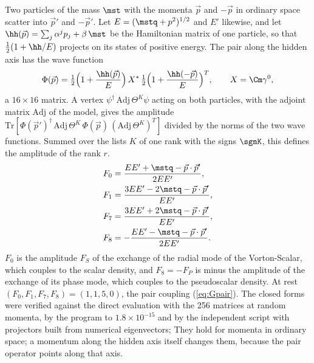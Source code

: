 Two particles of the mass $\mst$ with the momenta $\vec p$ and $-\vec p$ in ordinary space scatter
into $\vec p'$ and $-\vec p'$. Let $E=(\mstq+p^{2})^{1/2}$ and $E'$ likewise, and let
$\hh(\vec p)=\sum_j\alpha^{j}p_j+\beta\,\mst$ be the Hamiltonian matrix of one particle, so that
$\tfrac12(1+\hh/E)$ projects on its states of positive energy. The pair along the hidden axis has
the wave function
\begin{equation}
\Phi(\vec p)=\tfrac12\Big(1+\frac{\hh(\vec p)}{E}\Big)\,X^{*}\,\tfrac12\Big(1+\frac{\hh(-\vec p)}{E}\Big)^{T},\qquad X=\Cm\gamma^{0},
\end{equation}
a $16\times16$ matrix. A vertex $\psi^\dagger\,\mathrm{Adj}\,\Theta^{K}\psi$ acting on both particles,
with the adjoint matrix $\mathrm{Adj}$ of the model, gives the amplitude
$\mathrm{Tr}[\Phi(\vec p')^\dagger\,\mathrm{Adj}\,\Theta^{K}\,\Phi(\vec p)\,(\mathrm{Adj}\,\Theta^{K})^{T}]$
divided by the norms of the two wave functions. Summed over the lists $K$ of one rank with the signs
$\sgnK$, this defines the amplitude of the rank $r$. 
\begin{equation}
\begin{aligned}
F_0&=\frac{EE'+\mstq-\vec p\cdot\vec p'}{2EE'},\\
F_1&=\frac{3EE'-2\mstq-\vec p\cdot\vec p'}{EE'},\\
F_7&=\frac{3EE'+2\mstq-\vec p\cdot\vec p'}{EE'},\\
F_8&=-\frac{EE'-\mstq-\vec p\cdot\vec p'}{2EE'} .
\end{aligned}
\label{eq:Fclosed}
\end{equation}
$F_0$ is the amplitude $F_S$ of the exchange of the radial mode of the Vorton-Scalar, which couples
to the scalar density, and $F_8=-F_P$ is minus the amplitude of the exchange of its phase mode,
which couples to the pseudoscalar density. At rest $(F_0,F_1,F_7,F_8)=(1,1,5,0)$, the pair coupling
(\ref{eq:Gpair}). The closed forms were verified against the direct evaluation with the 256 matrices
at random momenta, by the program to $1.8\times10^{-15}$ and by the independent script with
projectors built from numerical eigenvectors;  They
hold for momenta in ordinary space; a momentum along the hidden axis itself changes them, because
the pair operator points along that axis.

